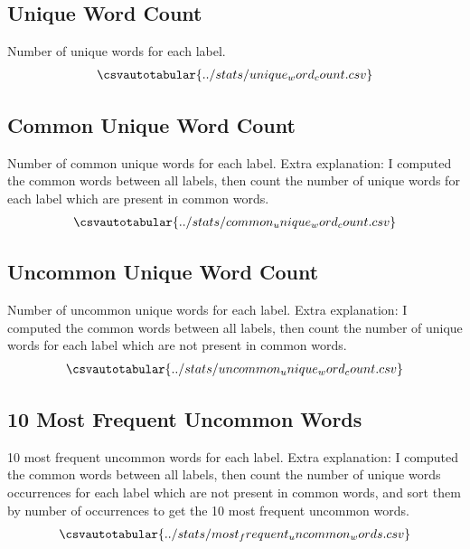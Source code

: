 \subsection{Unique Word Count}
Number of unique words for each label.
\begin{align*}
    \csvautotabular{../stats/unique_word_count.csv}
\end{align*}

\subsection{Common Unique Word Count}
Number of common unique words for each label.  
Extra explanation: I computed the common words between all labels, then count the number of unique words for each label which are present in common words.
\begin{align*}
    \csvautotabular{../stats/common_unique_word_count.csv}
\end{align*}

\subsection{Uncommon Unique Word Count}
Number of uncommon unique words for each label.  
Extra explanation: I computed the common words between all labels, then count the number of unique words for each label which are not present in common words.
\begin{align*}
    \csvautotabular{../stats/uncommon_unique_word_count.csv}
\end{align*}

\subsection{10 Most Frequent Uncommon Words}
10 most frequent uncommon words for each label.  
Extra explanation: I computed the common words between all labels, then count the number of unique words occurrences for each label which are not present in common words, and sort them by number of occurrences to get the 10 most frequent uncommon words.
\begin{align*}
    \csvautotabular{../stats/most_frequent_uncommon_words.csv}
\end{align*}

